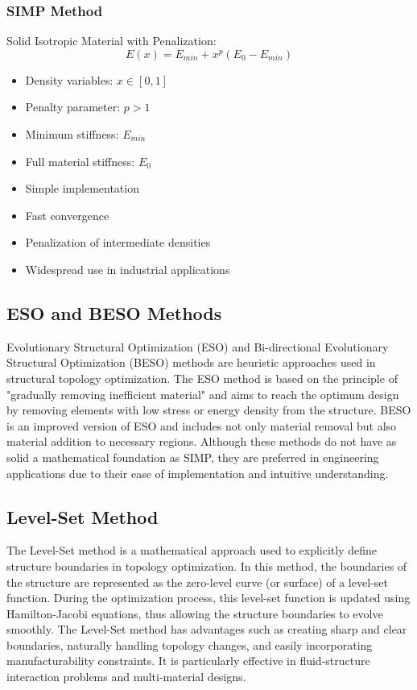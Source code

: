\subsubsection{SIMP Method}
Solid Isotropic Material with Penalization:
\begin{equation}
E(x) = E_{min} + x^p(E_0 - E_{min})
\end{equation}

\begin{itemize}
    \item Density variables: $x \in [0,1]$
    \item Penalty parameter: $p > 1$
    \item Minimum stiffness: $E_{min}$
    \item Full material stiffness: $E_0$
\end{itemize}

\begin{tcolorbox}[title=Advantages of SIMP Method]
\begin{itemize}
    \item Simple implementation
    \item Fast convergence
    \item Penalization of intermediate densities
    \item Widespread use in industrial applications
\end{itemize}
\end{tcolorbox}

\subsection{ESO and BESO Methods}
Evolutionary Structural Optimization (ESO) and Bi-directional Evolutionary Structural Optimization (BESO) methods are heuristic approaches used in structural topology optimization. The ESO method is based on the principle of "gradually removing inefficient material" and aims to reach the optimum design by removing elements with low stress or energy density from the structure. BESO is an improved version of ESO and includes not only material removal but also material addition to necessary regions. Although these methods do not have as solid a mathematical foundation as SIMP, they are preferred in engineering applications due to their ease of implementation and intuitive understanding.

\subsection{Level-Set Method}
The Level-Set method is a mathematical approach used to explicitly define structure boundaries in topology optimization. In this method, the boundaries of the structure are represented as the zero-level curve (or surface) of a level-set function. During the optimization process, this level-set function is updated using Hamilton-Jacobi equations, thus allowing the structure boundaries to evolve smoothly. The Level-Set method has advantages such as creating sharp and clear boundaries, naturally handling topology changes, and easily incorporating manufacturability constraints. It is particularly effective in fluid-structure interaction problems and multi-material designs. 